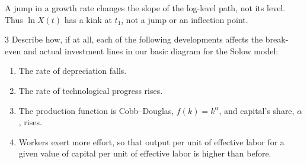 \begin{note}
    A jump in a growth rate changes the slope of the log-level path, not its level.
    Thus \(\ln X\left(t\right)\) has a kink at \(t_1\), not a jump or an inflection point.
\end{note}

\begin{problem}{3}
Describe how, if at all, each of the following developments affects the break-even and actual
investment lines in our basic diagram for the Solow model:
\begin{enumerate}[label=(\alph*)]
    \item The rate of depreciation falls.
    \item The rate of technological progress rises.
    \item The production function is Cobb--Douglas, \(f\left(k\right)=k^{\alpha}\), and
    capital's share, \(\alpha\), rises.
    \item Workers exert more effort, so that output per unit of effective labor for a given value
    of capital per unit of effective labor is higher than before.
\end{enumerate}
\end{problem}


